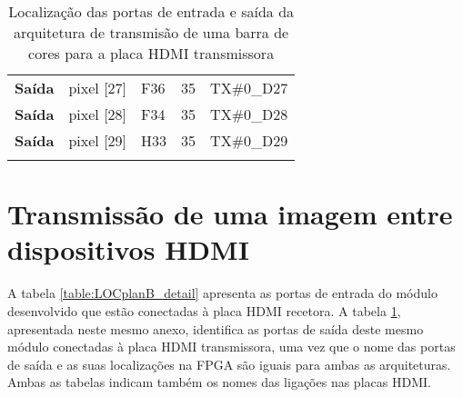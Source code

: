 \begin{longtable}{@{}rllll@{}}
			\multicolumn{1}{r|}{\textbf{Saída}} & pixel {[}27{]}                     & F36                                      & 35                                         & TX\#0\_D27                                      \\
			\multicolumn{1}{r|}{\textbf{Saída}} & pixel {[}28{]}                     & F34                                      & 35                                         & TX\#0\_D28                                      \\
			\multicolumn{1}{r|}{\textbf{Saída}} & pixel {[}29{]}                     & H33                                      & 35                                         & TX\#0\_D29                                      \\  
			\hline 
		
	\caption{Localização das portas de entrada e saída da arquitetura de transmisão de uma barra de cores para a placa HDMI transmissora}
	\label{table:locPlanAdetail}
\end{longtable}





\section{Transmissão de uma imagem entre dispositivos HDMI} \label{ap3:imagem_RX_TX}
A tabela \ref{table:LOCplanB_detail} apresenta as portas de entrada do módulo desenvolvido que estão conectadas à placa HDMI recetora. A tabela \ref{table:locPlanAdetail}, apresentada neste mesmo anexo, identifica as portas de saída deste mesmo módulo conectadas à placa HDMI transmissora, uma vez que o nome das portas de saída e as suas localizações na FPGA são iguais para ambas as arquiteturas. Ambas as tabelas indicam também os nomes das ligações nas placas HDMI.

